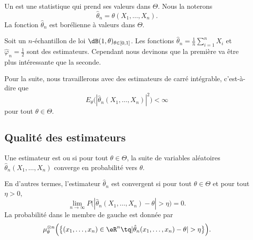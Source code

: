 Un  est une statistique qui prend ses valeurs dans \( \Theta\). Nous la noterons
\begin{equation}
	\hat\theta_n=\theta(X_1,\ldots,X_n).
\end{equation}
La fonction \( \hat\theta_n\) est borélienne à valeurs dans \( \Theta\).

\begin{example}
	Soit un \( n\)-échantillon de loi \( \dB(1,\theta)_{\theta\in\mathopen[ 0 , 1 \mathclose]}\). Les fonctions \( \hat\theta_n=\frac{1}{ n }\sum_{i=1}^nX_i\) et \( \hat\varphi_n=\frac{ 1 }{2}\) sont des estimateurs. Cependant nous devinons que la première va être plus intéressante que la seconde.
\end{example}

Pour la suite, nous travaillerons avec des estimateurs de carré intégrable, c'est-à-dire que
\begin{equation}
	E_{\theta}\big( | \hat\theta_n(X_1,\ldots,X_n) |^2 \big)<\infty
\end{equation}
pour tout \( \theta\in\Theta\).

\subsection{Qualité des estimateurs}

\begin{definition}
	Une estimateur est  ou  si pour tout \( \theta\in\Theta\), la suite de variables aléatoires \( \hat\theta_n(X_1,\ldots,X_n)\) converge en probabilité vers \( \theta\).
\end{definition}
En d'autres termes, l'estimateur \( \hat\theta_n\) est convergent si pour tout \( \theta\in\Theta\) et pour tout \( \eta>0\),
\begin{equation}
	\lim_{n\to \infty} P\big( | \hat\theta_n(X_1,\ldots,X_n)-\theta |>\eta \big)=0.
\end{equation}
La probabilité dans le membre de gauche est donnée par
\begin{equation}
	\mu^{\otimes n}_{\theta}\Big( \big\{ (x_1,\ldots,x_n)\in\eR^n\tq| \hat\theta_n(x_1,\ldots,x_n)-\theta |>\eta \big\} \Big).
\end{equation}


